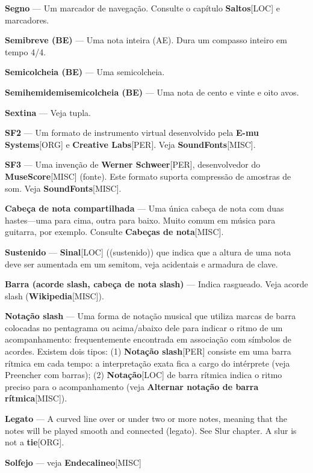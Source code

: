 \documentclass[a4paper,12pt]{article}
\begin{document}
\textbf{Segno} --- Um marcador de navegação. Consulte o capítulo \textbf{Saltos}\textsc{[LOC]} e marcadores.

\textbf{Semibreve (BE)} --- Uma nota inteira (AE). Dura um compasso inteiro em tempo 4/4.

\textbf{Semicolcheia (BE)} --- Uma semicolcheia.

\textbf{Semihemidemisemicolcheia (BE)} --- Uma nota de cento e vinte e oito avos.

\textbf{Sextina} --- Veja tupla.

\textbf{SF2} --- Um formato de instrumento virtual desenvolvido pela \textbf{E-mu Systems}\textsc{[ORG]} e \textbf{Creative Labs}\textsc{[PER]}. Veja \textbf{SoundFonts}\textsc{[MISC]}.

\textbf{SF3} --- Uma invenção de \textbf{Werner Schweer}\textsc{[PER]}, desenvolvedor do \textbf{MuseScore}\textsc{[MISC]} (fonte). Este formato suporta compressão de amostras de som. Veja \textbf{SoundFonts}\textsc{[MISC]}.

\textbf{Cabeça de nota compartilhada} --- Uma única cabeça de nota com duas hastes---uma para cima, outra para baixo. Muito comum em música para guitarra, por exemplo. Consulte \textbf{Cabeças de nota}\textsc{[MISC]}.

\textbf{Sustenido} --- \textbf{Sinal}\textsc{[LOC]} ((sustenido)) que indica que a altura de uma nota deve ser aumentada em um semitom, veja acidentais e armadura de clave.

\textbf{Barra (acorde slash, cabeça de nota slash)} --- Indica rasgueado. Veja acorde slash (\textbf{Wikipedia}\textsc{[MISC]}).

\textbf{Notação slash} --- Uma forma de notação musical que utiliza marcas de barra colocadas no pentagrama ou acima/abaixo dele para indicar o ritmo de um acompanhamento: frequentemente encontrada em associação com símbolos de acordes. Existem dois tipos: (1) \textbf{Notação slash}\textsc{[PER]} consiste em uma barra rítmica em cada tempo: a interpretação exata fica a cargo do intérprete (veja Preencher com barras); (2) \textbf{Notação}\textsc{[LOC]} de barra rítmica indica o ritmo preciso para o acompanhamento (veja \textbf{Alternar notação de barra rítmica}\textsc{[MISC]}).

\textbf{Legato} --- A curved line over or under two or more notes, meaning that the notes will be played smooth and connected (legato). See Slur chapter. A slur is not a \textbf{tie}\textsc{[ORG]}.

\textbf{Solfejo} --- veja \textbf{Endecalineo}\textsc{[MISC]}
\end{document}
